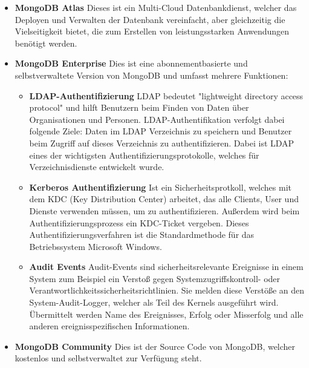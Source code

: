 \begin{itemize}
    \item \textbf{MongoDB Atlas}
        \newline
        Dieses ist ein Multi-Cloud Datenbankdienst, welcher das Deployen und Verwalten der Datenbank vereinfacht, aber gleichzeitig die Vielseitigkeit bietet, die zum Erstellen von leistungsstarken Anwendungen benötigt werden.
    \item \textbf{MongoDB Enterprise}
        \newline
        Dies ist eine abonnementbasierte und selbstverwaltete Version von MongoDB und umfasst mehrere Funktionen:
        \begin{itemize}
            \item \textbf{LDAP-Authentifizierung}
                \newline
                LDAP bedeutet "lightweight directory access protocol" und hilft Benutzern beim Finden von Daten über Organisationen und Personen. LDAP-Authentifikation verfolgt dabei folgende Ziele: Daten im LDAP Verzeichnis zu speichern und Benutzer beim Zugriff auf dieses Verzeichnis zu authentifizieren. Dabei ist LDAP eines der wichtigsten Authentifizierungsprotokolle, welches für Verzeichnisdienste entwickelt wurde.
                \cite{ldap_auth}
            \item \textbf{Kerberos Authentifizierung}
                \newline
                Ist ein Sicherheitsprotkoll, welches mit dem KDC (Key Distribution Center) arbeitet, das alle Clients, User und Dienste verwenden müssen, um zu authentifizieren. Außerdem wird beim Authentifizierungsprozess ein KDC-Ticket vergeben. Dieses Authentifizierungsverfahren ist die Standardmethode für das Betriebssystem Microsoft Windows.
                \cite{kerberos_auth}
            \item \textbf{Audit Events}
                \newline
                Audit-Events sind sicherheitsrelevante Ereignisse in einem System zum Beispiel ein Verstoß gegen Systemzugriffskontroll- oder Verantwortlichkeitssicherheitsrichtlinien. Sie melden diese Verstöße an den System-Audit-Logger, welcher als Teil des Kernels ausgeführt wird. Übermittelt werden Name des Ereignisses, Erfolg oder Misserfolg und alle anderen ereignisspezifischen Informationen.
                \cite{audit_events}
\end{itemize}
    \item \textbf{MongoDB Community}
        \newline
        Dies ist der Source Code von MongoDB, welcher kostenlos und selbstverwaltet zur Verfügung steht.
\end{itemize}
\cite{mongodb_basics}

